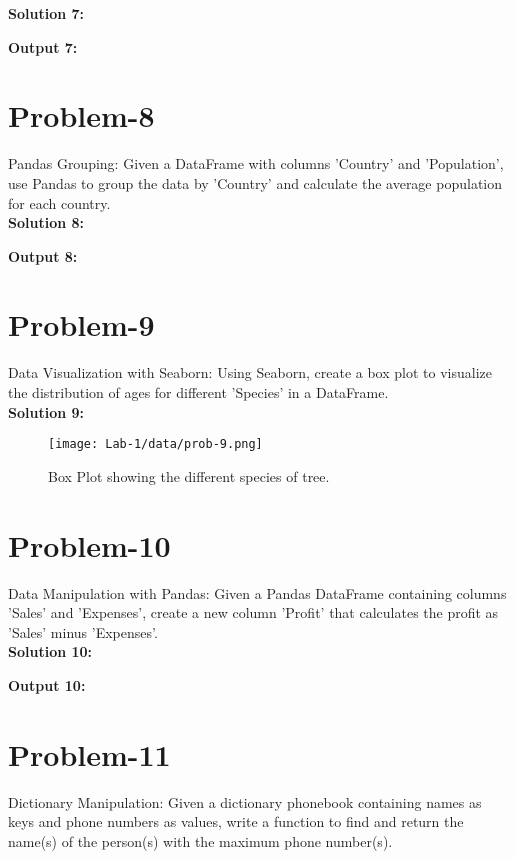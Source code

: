 \textbf{Solution 7: }


\textbf{Output 7: }
\\

\section{Problem-8}
Pandas Grouping: Given a DataFrame with columns ’Country’ and ’Population’, use Pandas to group the data by ’Country’ and calculate the average population for each country.\\

\textbf{Solution 8: }


\textbf{Output 8:}
\\

\section{Problem-9}
Data Visualization with Seaborn: Using Seaborn, create a box plot to visualize the distribution of ages for different ’Species’ in a DataFrame.\\

\textbf{Solution 9: }


\begin{figure}[ht]
\centering
\texttt{[image: Lab-1/data/prob-9.png]}
\caption{Box Plot showing the different species of tree.}
\label{fig:sample}
\end{figure}

\FloatBarrier

\section{Problem-10}
Data Manipulation with Pandas: Given a Pandas DataFrame containing columns ’Sales’ and ’Expenses’, create a new column ’Profit’ that calculates the profit as ’Sales’ minus ’Expenses’.\\

\textbf{Solution 10: }


\textbf{Output 10: }
\\

\section{Problem-11}
Dictionary Manipulation: Given a dictionary phonebook containing names as keys and phone numbers as values, write a function to find and return the name(s) of the person(s) with the maximum phone number(s).\\

